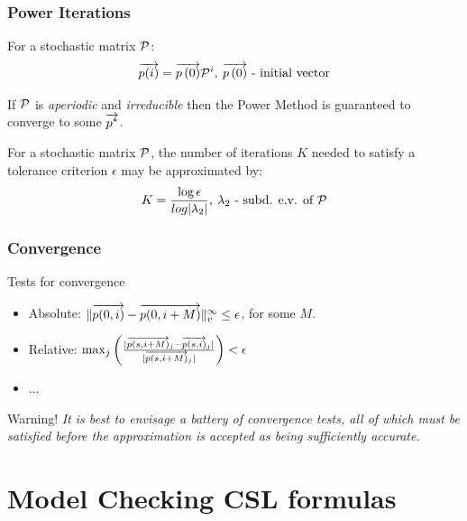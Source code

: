 \documentclass{beamer}
\begin{document}
\frame
{
	\frametitle{Power Iterations  \cite{Stewart_94}}
	{\small
	\begin{definition}
		For a stochastic matrix $\mathcal{P}$:
		\begin{equation}
			\overrightarrow{p(i)}  = \overrightarrow{p \left( 0 \right)} \mathcal{P}^i, \: \overrightarrow{p \left( 0 \right)} \textrm{ - initial vector} \nonumber
		\end{equation}
	\end{definition}
	\begin{theorem}
		 If $\mathcal{P}$ is \emph{aperiodic} and \emph{irreducible} then the Power Method is guaranteed to converge to some $\overrightarrow{p^{*}}$.
	\end{theorem}
	\begin{lemma}
		For a stochastic matrix $\mathcal{P}$, the number of iterations $K$ needed to satisfy a tolerance criterion $\epsilon$ may be approximated by:
		\begin{equation}
			K = \dfrac{\log \epsilon}{log | \lambda_{2} |}, \: \lambda_{2} \textrm{ - subd. e.v. of }\mathcal{P} \nonumber
		\end{equation}
	\end{lemma}
	}
}
	
\frame
{
	\frametitle{Convergence \cite{Stewart_94}}
	
	\begin{alertblock}{Tests for convergence}
		\begin{itemize}
			\item Absolute: $\lVert  \overrightarrow{p(0,i)} - \overrightarrow{p(0,i+M)}  \rVert_{v}^{\infty} \leq \epsilon$, for some $M$.
			\item Relative: $\max_{j} \left( \frac{ | \overrightarrow{p(s,i{+}M)}_{j} - \overrightarrow{p(s,i)}_{j} |}{ | \overrightarrow{p(s,i{+}M)}_{j}  |} \right) < \epsilon$
			\item ...
		\end{itemize}
	\end{alertblock}
		
	\begin{block}{\alert{Warning!}}
		\emph{It is best to envisage a battery of convergence tests, all of which must be satisfied before the approximation is accepted as being sufficiently accurate.}
	\end{block}
}
	
\section{Model Checking CSL formulas}

\end{document}
